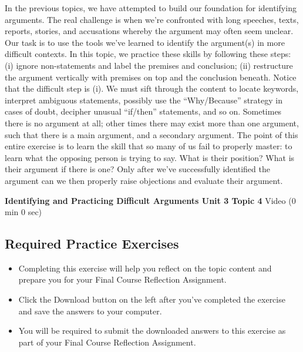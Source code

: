 \documentclass[
]{book}
\providecommand{\tightlist}{%
  \setlength{\itemsep}{0pt}\setlength{\parskip}{0pt}}
\begin{document}
In the previous topics, we have attempted to build our foundation for identifying arguments. The real challenge is when we're confronted with long speeches, texts, reports, stories, and accusations whereby the argument may often seem unclear. Our task is to use the tools we've learned to identify the argument(s) in more difficult contexts. In this topic, we practice these skills by following these steps: (i) ignore non-statements and label the premises and conclusion; (ii) restructure the argument vertically with premises on top and the conclusion beneath. Notice that the difficult step is (i). We must sift through the content to locate keywords, interpret ambiguous statements, possibly use the ``Why/Because'' strategy in cases of doubt, decipher unusual ``if/then'' statements, and so on. Sometimes there is no argument at all; other times there may exist more than one argument, such that there is a main argument, and a secondary argument. The point of this entire exercise is to learn the skill that so many of us fail to properly master: to learn what the opposing person is trying to say. What is their position? What is their argument if there is one? Only after we've successfully identified the argument can we then properly raise objections and evaluate their argument.

\textbf{Identifying and Practicing Difficult Arguments Unit 3 Topic 4} Video (0 min 0 sec)

\hypertarget{required-practice-exercises}{%
\subsection*{Required Practice Exercises}\label{required-practice-exercises}}

\begin{reflect}
\begin{itemize}
\tightlist
\item
  Completing this exercise will help you reflect on the topic content and prepare you for your Final Course Reflection Assignment.
\item
  Click the Download button on the left after you've completed the exercise and save the answers to your computer.
\item
  You will be required to submit the downloaded answers to this exercise as part of your Final Course Reflection Assignment.
\end{itemize}
\end{reflect}
\end{document}
